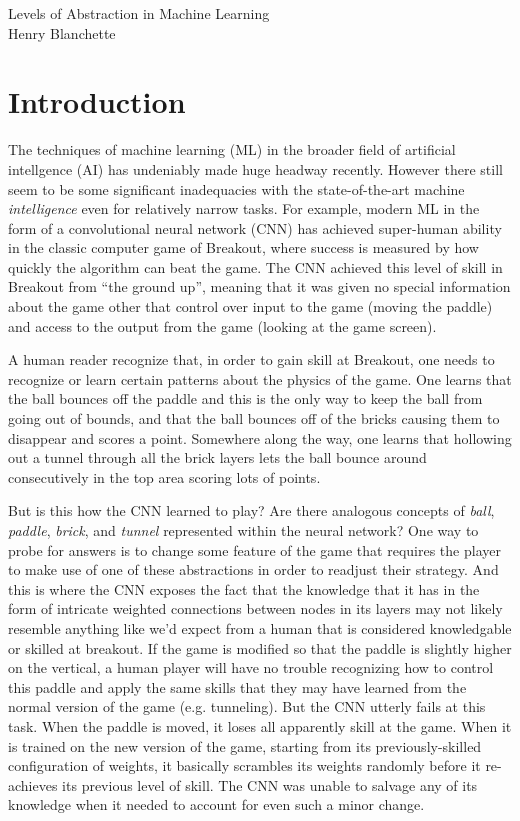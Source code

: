 \documentclass{article}
\renewcommand{\it}{\textit}
\begin{document}
\begin{center}
{\Large \sc Levels of Abstraction in Machine Learning}
\\[2em]
{\large Henry Blanchette}
\end{center}

\vspace{2em}

\section{Introduction}

The techniques of machine learning (ML) in the broader field of artificial intellgence (AI) has undeniably made huge headway recently.
However there still seem to be some significant inadequacies with the state-of-the-art machine \it{intelligence} even for relatively narrow tasks.
For example, modern ML in the form of a convolutional neural network (CNN) has achieved super-human ability in the classic computer game of Breakout, where success is measured by how quickly the algorithm can beat the game.
The CNN achieved this level of skill in Breakout from ``the ground up'', meaning that it was given no special information about the game other that control over input to the game (moving the paddle) and access to the output from the game (looking at the game screen).

A human reader recognize that, in order to gain skill at Breakout, one needs to recognize or learn certain patterns about the physics of the game.
One learns that the ball bounces off the paddle and this is the only way to keep the ball from going out of bounds, and that the ball bounces off of the bricks causing them to disappear and scores a point.
Somewhere along the way, one learns that hollowing out a tunnel through all the brick layers lets the ball bounce around consecutively in the top area scoring lots of points.

But is this how the CNN learned to play? Are there analogous concepts of \it{ball}, \it{paddle}, \it{brick}, and \it{tunnel} represented within the neural network?
One way to probe for answers is to change some feature of the game that requires the player to make use of one of these abstractions in order to readjust their strategy.
And this is where the CNN exposes the fact that the knowledge that it has in the form of intricate weighted connections between nodes in its layers may not likely resemble anything like we'd expect from a human that is considered knowledgable or skilled at breakout.
If the game is modified so that the paddle is slightly higher on the vertical, a human player will have no trouble recognizing how to control this paddle and apply the same skills that they may have learned from the normal version of the game (e.g. tunneling).
But the CNN utterly fails at this task.
When the paddle is moved, it loses all apparently skill at the game.
When it is trained on the new version of the game, starting from its previously-skilled configuration of weights, it basically scrambles its weights randomly before it re-achieves its previous level of skill.
The CNN was unable to salvage any of its knowledge when it needed to account for even such a minor change.
\end{document}
